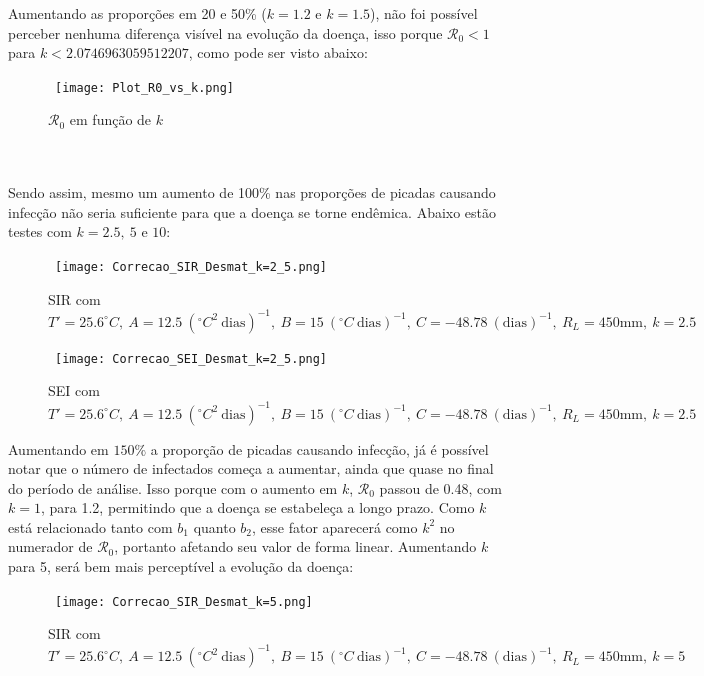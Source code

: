 Aumentando as proporções em 20 e 50\% ($k=1.2$ e $k=1.5$), não foi possível perceber
nenhuma diferença visível na evolução da doença, isso porque $\mathcal{R}_0 < 1$  
para $k < 2.0746963059512207$, como pode ser visto abaixo:
\begin{figure}[!ht]
        \centering
        \hbox{\hspace{3em} \texttt{[image: Plot\_R0\_vs\_k.png]}}
        \caption{$\mathcal{R}_0$ em função de $k$}
\end{figure} 
\\\\
Sendo assim, mesmo um aumento de 100\% nas proporções de picadas causando infecção
não seria suficiente para que a doença se torne endêmica. Abaixo estão testes com $k=2.5, \ 5$ e $10$:
\begin{figure}[!ht]
        \centering
        \hbox{\hspace{2.0em} \texttt{[image: Correcao\_SIR\_Desmat\_k=2\_5.png]}}
        \caption{SIR com $T'=25.6 ^\circ C, \ A=12.5 \ (^\circ C^2 \ \text{dias})^{-1}, \ B=15 \ (^\circ C \ \text{dias})^{-1}, \ C=-48.78 \ (\text{dias})^{-1}, \ R_L=450 \text{mm}, \ k=2.5$}
\end{figure} 
\begin{figure}[!ht]
        \centering
        \hbox{\hspace{1.5em} \texttt{[image: Correcao\_SEI\_Desmat\_k=2\_5.png]}}
        \caption{SEI com $T'=25.6 ^\circ C, \ A=12.5 \ (^\circ C^2 \ \text{dias})^{-1}, \ B=15 \ (^\circ C \ \text{dias})^{-1}, \ C=-48.78 \ (\text{dias})^{-1}, \ R_L=450 \text{mm}, \ k=2.5$}
\end{figure} 
\newpage
Aumentando em $150\%$ a proporção de picadas causando infecção, já é possível notar que o 
número de infectados começa a aumentar, ainda que quase no final do período 
de análise. Isso porque com o aumento em $k$, $\mathcal{R}_0$ passou de 0.48, 
com $k=1$, para 1.2, permitindo que a doença se estabeleça a longo prazo. Como $k$
está relacionado tanto com $b_1$ quanto $b_2$, esse fator aparecerá como $k^2$ no
numerador de $\mathcal{R}_0$, portanto afetando seu valor de forma linear.
Aumentando $k$ para 5, será bem mais perceptível a evolução da doença:
\begin{figure}[!ht]
        \centering
        \hbox{\hspace{3.7em} \texttt{[image: Correcao\_SIR\_Desmat\_k=5.png]}}
        \caption{SIR com $T'=25.6 ^\circ C, \ A=12.5 \ (^\circ C^2 \ \text{dias})^{-1}, \ B=15 \ (^\circ C \ \text{dias})^{-1}, \ C=-48.78 \ (\text{dias})^{-1}, \ R_L=450 \text{mm}, \ k=5$}
\end{figure} 

